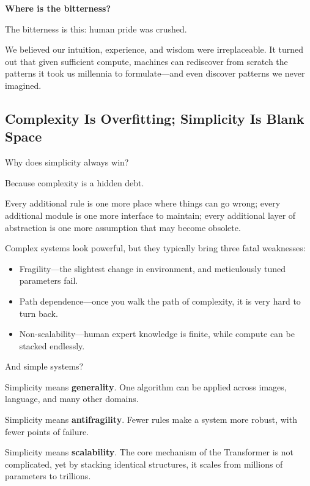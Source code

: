 \textbf{Where is the bitterness?}

The bitterness is this: human pride was crushed.

\vspace{1em}

We believed our intuition, experience, and wisdom were irreplaceable. It turned out that given sufficient compute, machines can rediscover from scratch the patterns it took us millennia to formulate---and even discover patterns we never imagined.

\subsection{Complexity Is Overfitting; Simplicity Is Blank Space}

Why does simplicity always win?

Because complexity is a hidden debt.

Every additional rule is one more place where things can go wrong; every additional module is one more interface to maintain; every additional layer of abstraction is one more assumption that may become obsolete.

Complex systems look powerful, but they typically bring three fatal weaknesses:

\begin{itemize}
\item Fragility---the slightest change in environment, and meticulously tuned parameters fail.

\item Path dependence---once you walk the path of complexity, it is very hard to turn back.

\item Non-scalability---human expert knowledge is finite, while compute can be stacked endlessly.
\end{itemize}

\vspace{1em}

And simple systems?

Simplicity means \textbf{generality}. One algorithm can be applied across images, language, and many other domains.

Simplicity means \textbf{antifragility}. Fewer rules make a system more robust, with fewer points of failure.

Simplicity means \textbf{scalability}. The core mechanism of the Transformer is not complicated, yet by stacking identical structures, it scales from millions of parameters to trillions.


